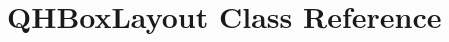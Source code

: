 \hypertarget{classGUI_1_1QtGui_1_1QHBoxLayout}{}\section{Q\+H\+Box\+Layout Class Reference}
\label{classGUI_1_1QtGui_1_1QHBoxLayout}
